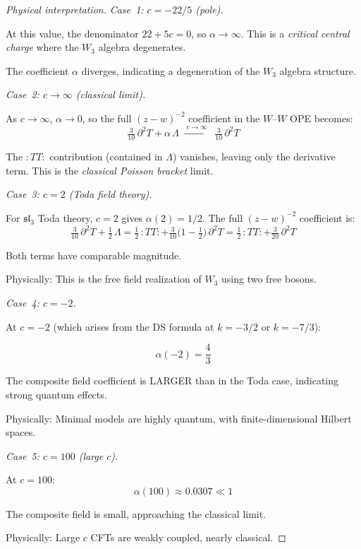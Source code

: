 \begin{proof}[Physical interpretation]

\emph{Case~1: $c = -22/5$ (pole).}

At this value, the denominator $22 + 5c = 0$, so $\alpha \to \infty$. This is a
\emph{critical central charge} where the $W_3$ algebra degenerates.

The coefficient $\alpha$ diverges, indicating a degeneration of the $W_3$ algebra structure.

\emph{Case~2: $c \to \infty$ (classical limit).}

As $c \to \infty$, $\alpha \to 0$, so the full $(z-w)^{-2}$ coefficient in the $W$--$W$ OPE becomes:
\[\tfrac{3}{10}\,\partial^2 T + \alpha\,\Lambda \;\xrightarrow{\;c \to \infty\;}\; \tfrac{3}{10}\,\partial^2 T\]

The $:TT:$ contribution (contained in $\Lambda$) vanishes, leaving only the derivative term.  This is the \emph{classical Poisson bracket} limit.

\emph{Case~3: $c = 2$ (Toda field theory).}

For $\mathfrak{sl}_3$ Toda theory, $c = 2$ gives $\alpha(2) = 1/2$.
The full $(z-w)^{-2}$ coefficient is:
\[\tfrac{3}{10}\,\partial^2 T + \tfrac{1}{2}\,\Lambda = \tfrac{1}{2}\,{:}TT{:} + \tfrac{3}{10}\bigl(1 - \tfrac{1}{2}\bigr)\,\partial^2 T = \tfrac{1}{2}\,{:}TT{:} + \tfrac{3}{20}\,\partial^2 T\]

Both terms have comparable magnitude.

Physically: This is the free field realization of $W_3$ using two free bosons.

\emph{Case~4: $c = -2$.}

At $c = -2$ (which arises from the DS formula at $k = -3/2$ or $k = -7/3$):

\[\alpha(-2) = \frac{4}{3}\]

The composite field coefficient is LARGER than in the Toda case, indicating strong 
quantum effects.

Physically: Minimal models are highly quantum, with finite-dimensional Hilbert spaces.

\emph{Case~5: $c = 100$ (large $c$).}

At $c = 100$:
\[\alpha(100) \approx 0.0307 \ll 1\]

The composite field is small, approaching the classical limit.

Physically: Large $c$ CFTs are weakly coupled, nearly classical.
\end{proof}

